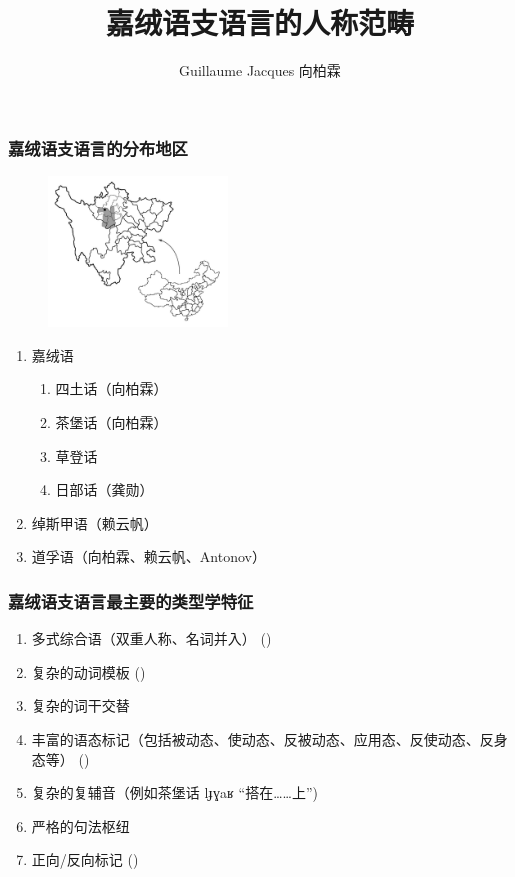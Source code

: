 \documentclass[xcolor=table]{beamer}
\newcommand{\ipa}[1]{{\phon \mbox{#1}}} %
\begin{document}
 \title{嘉绒语支语言的人称范畴}
 \author{Guillaume Jacques  向柏霖}
 \maketitle
  
    \begin{frame} 
 \frametitle{嘉绒语支语言的分布地区} 
 \begin{figure}[H]
\centering
\includegraphics[height=40mm]{carte.JPG}
\end{figure}
  \begin{enumerate}%
    \item 嘉绒语
    \begin{enumerate}
 \item 四土话（向柏霖）
 \item 茶堡话（向柏霖）
  \item 草登话
 \item 日部话（龚勋）
  \end{enumerate}
  \item 绰斯甲语（赖云帆）
    \item 道孚语（向柏霖、赖云帆、Antonov）
 \end{enumerate}
  \end{frame}
  
  
     
    \begin{frame} 
 \frametitle{嘉绒语支语言最主要的类型学特征}  
 
 \begin{enumerate}%
 \item 多式综合语（双重人称、名词并入） (\citealt{jacques12incorp})
 \item 复杂的动词模板 (\citealt{jacques13harmonization, lai13affixale})
  \item 复杂的词干交替
 \item 丰富的语态标记（包括被动态、使动态、反被动态、应用态、反使动态、反身态等） (\citealt{lai13affixale, jacques14antipassive})
 \item 复杂的复辅音（例如茶堡话 \ipa{lɟɣaʁ} “搭在……上”)
 \item  严格的句法枢纽
  \item 正向/反向标记 (\citealt{jackson02rentongdengdi, jacques10inverse, gongxun14agreement, lai14person})

 \end{enumerate}
   
  \end{frame}   
  
\end{document}
